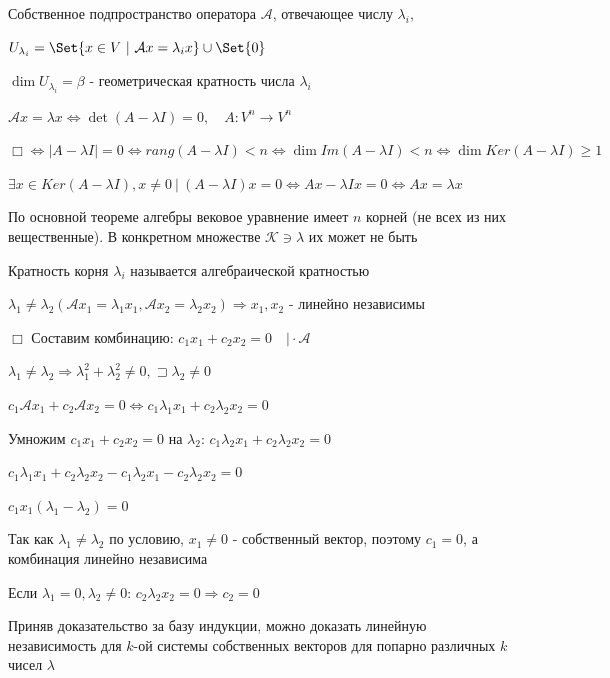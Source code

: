 \documentclass[12pt]{article}
\begin{document}
    \Def Собственное подпространство оператора $\mathcal{A}$, отвечающее числу $\lambda_i$,

    $U_{\lambda_i} = \Set{x \in V \ | \ \mathcal{A}x = \lambda_i x} \union \Set{0}$

    \Def $\dim U_{\lambda_i} = \beta$ - геометрическая кратность числа $\lambda_i$

    \Th $\mathcal{A}x = \lambda x \Longleftrightarrow \det(A - \lambda I) = 0, \quad A : V^n \rightarrow V^n$

    $\Box \Longleftrightarrow |A - \lambda I| = 0 \Longleftrightarrow rang (A - \lambda I) < n \Longleftrightarrow
    \dim Im(A - \lambda I) < n \Longleftrightarrow \dim Ker(A - \lambda I) \geq 1$

    $\exists x \in Ker(A - \lambda I), x \neq 0 \ | \ (A - \lambda I) x = 0 \Longleftrightarrow Ax - \lambda I x = 0 \Longleftrightarrow Ax = \lambda x$

    \Nota По основной теореме алгебры вековое уравнение имеет $n$ корней (не всех из них вещественные).
    В конкретном множестве $\mathcal{K} \ni \lambda$ их может не быть

    \Def Кратность корня $\lambda_i$ называется алгебраической кратностью

    \Th $\lambda_1 \neq \lambda_2 (\mathcal{A}x_1 = \lambda_1 x_1, \mathcal{A}x_2 = \lambda_2 x_2) \Longrightarrow x_1, x_2$ - линейно независимы

    $\Box$ Составим комбинацию: $c_1 x_1 + c_2 x_2 = 0 \quad \Big| \cdot \mathcal{A}$

    $\lambda_1 \neq \lambda_2 \Longrightarrow \lambda_1^2 + \lambda_2^2 \neq 0, \sqsupset \lambda_2 \neq 0$

    $c_1 \mathcal{A} x_1 + c_2 \mathcal{A} x_2 = 0 \Longleftrightarrow c_1 \lambda_1 x_1 + c_2 \lambda_2 x_2 = 0$

    Умножим $c_1 x_1 + c_2 x_2 = 0$ на $\lambda_2$: $c_1 \lambda_2 x_1 + c_2 \lambda_2 x_2 = 0$

    $c_1 \lambda_1 x_1 + c_2 \lambda_2 x_2 - c_1 \lambda_2 x_1 - c_2 \lambda_2 x_2 = 0$

    $c_1 x_1(\lambda_1 - \lambda_2) = 0$

    Так как $\lambda_1 \neq \lambda_2$ по условию, $x_1 \neq 0$ - собственный вектор, поэтому $c_1 = 0$, а комбинация линейно независима

    Если $\lambda_1 = 0, \lambda_2 \neq 0$: $c_2 \lambda_2 x_2 = 0 \Longrightarrow c_2 = 0$

    \Nota Приняв доказательство за базу индукции, можно доказать линейную независимость для $k$-ой системы собственных векторов для попарно различных $k$ чисел $\lambda$
\end{document}
